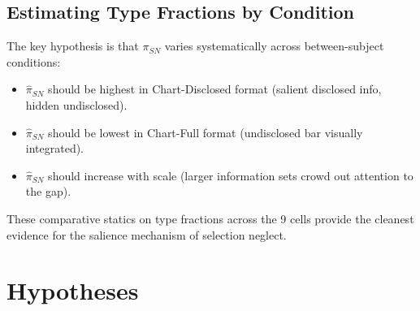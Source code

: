 \documentclass[12pt]{article}
\theoremstyle{definition}
\begin{document}
\subsection{Estimating Type Fractions by Condition}

The key hypothesis is that $\pi_{SN}$ varies systematically across between-subject conditions:
\begin{itemize}[nosep]
\item $\hat{\pi}_{SN}$ should be highest in Chart-Disclosed format (salient disclosed info, hidden undisclosed).
\item $\hat{\pi}_{SN}$ should be lowest in Chart-Full format (undisclosed bar visually integrated).
\item $\hat{\pi}_{SN}$ should increase with scale (larger information sets crowd out attention to the gap).
\end{itemize}

These comparative statics on type fractions across the 9 cells provide the cleanest evidence for the salience mechanism of selection neglect.


\section{Hypotheses}
\label{sec:hypotheses}
\end{document}
